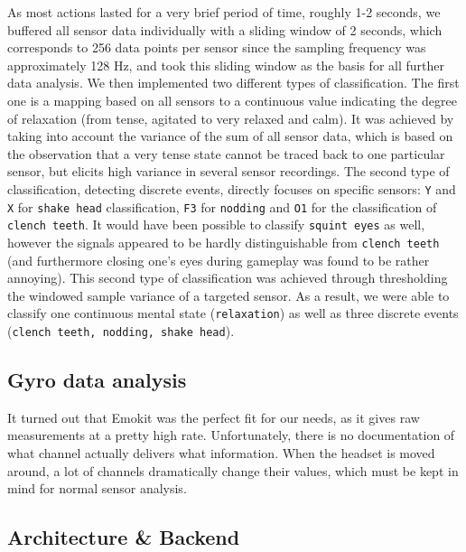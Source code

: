 \documentclass{utue} %
\begin{document}
As most actions lasted for a very brief period of time, roughly 1-2 seconds, we buffered all sensor data individually with a sliding window of 2 seconds, which corresponds to 256 data points per sensor since the sampling frequency was approximately 128 Hz, and took this sliding window as the basis for all further data analysis. We then implemented two different types of classification. The first one is a mapping based on all sensors to a continuous value indicating the degree of relaxation (from tense, agitated to very relaxed and calm). It was achieved by taking into account the variance of the sum of all sensor data, which is based on the observation that a very tense state cannot be traced back to one particular sensor, but elicits high variance in several sensor recordings. The second type of classification, detecting discrete events, directly focuses on specific sensors: 
\texttt{Y} and \texttt{X} for \texttt{shake head} classification, \texttt{F3} for \texttt{nodding} and \texttt{O1} for the classification of \texttt{clench teeth}. It would have been possible to classify \texttt{squint eyes} as well, however the signals appeared to be hardly distinguishable from \texttt{clench teeth} (and furthermore closing one's eyes during gameplay was found to be rather annoying). This second type of classification was achieved through thresholding the windowed sample variance of a targeted sensor. As a result, we were able to classify one continuous mental state (\texttt{relaxation}) as well as three discrete events (\texttt{clench teeth, nodding, shake head}).

\subsection{Gyro data analysis}

It turned out that Emokit was the perfect fit for our needs, as it gives raw measurements at a pretty high rate. Unfortunately, there is no documentation of what channel actually delivers what information. When the headset is moved around, a lot of channels dramatically change their values, which must be kept in mind for normal sensor analysis. 


\subsection{Architecture \& Backend}
\end{document}
